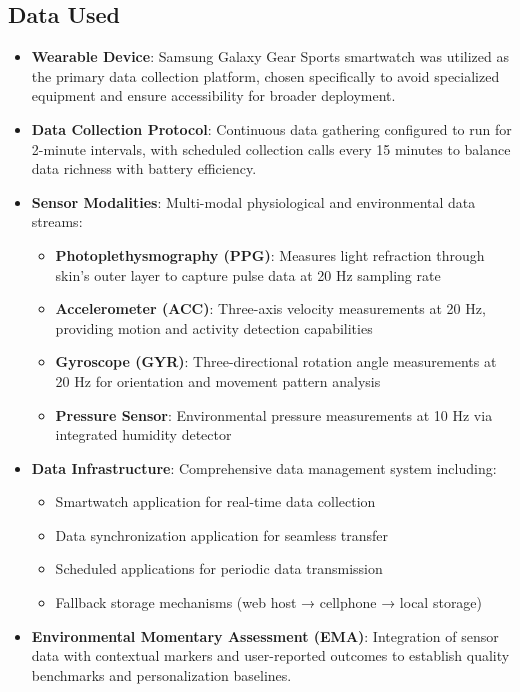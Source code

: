 \subsection*{Data Used}
\begin{itemize}
    \item \textbf{Wearable Device}: Samsung Galaxy Gear Sports smartwatch was utilized as the primary data collection platform, chosen specifically to avoid specialized equipment and ensure accessibility for broader deployment.
    \item \textbf{Data Collection Protocol}: Continuous data gathering configured to run for 2-minute intervals, with scheduled collection calls every 15 minutes to balance data richness with battery efficiency.
    \item \textbf{Sensor Modalities}: Multi-modal physiological and environmental data streams:
    \begin{itemize}
        \item \textbf{Photoplethysmography (PPG)}: Measures light refraction through skin's outer layer to capture pulse data at 20 Hz sampling rate
        \item \textbf{Accelerometer (ACC)}: Three-axis velocity measurements at 20 Hz, providing motion and activity detection capabilities
        \item \textbf{Gyroscope (GYR)}: Three-directional rotation angle measurements at 20 Hz for orientation and movement pattern analysis
        \item \textbf{Pressure Sensor}: Environmental pressure measurements at 10 Hz via integrated humidity detector
    \end{itemize}
    \item \textbf{Data Infrastructure}: Comprehensive data management system including:
    \begin{itemize}
        \item Smartwatch application for real-time data collection
        \item Data synchronization application for seamless transfer
        \item Scheduled applications for periodic data transmission
        \item Fallback storage mechanisms (web host → cellphone → local storage)
    \end{itemize}
    \item \textbf{Environmental Momentary Assessment (EMA)}: Integration of sensor data with contextual markers and user-reported outcomes to establish quality benchmarks and personalization baselines.
\end{itemize}

